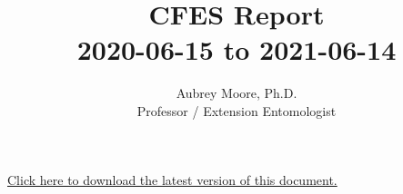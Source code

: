 



\usepackage[breaklinks=true, colorlinks=True, allcolors=blue]{hyperref}

\usepackage{indentfirst} 
\usepackage{comment}

\newcommand{\activities}{\medskip\textbf{Activities}}
\newcommand{\plans}{\medskip\textbf{Plans}}

\makeatletter

\makeatother






\title{CFES Report\\2020-06-15 to 2021-06-14}

\author{Aubrey Moore, Ph.D.\\
Professor / Extension Entomologist}

\maketitle

\begin{center}
\href{https://aubreymoore.github.io/CFES2020-22/CFES2020-06-15to2021-06-14.pdf}{Click here to download the latest version of this document.}
\end{center}

%
\setcounter{secnumdepth}{0} %
\setcounter{tocdepth}{2}
\tableofcontents{}

